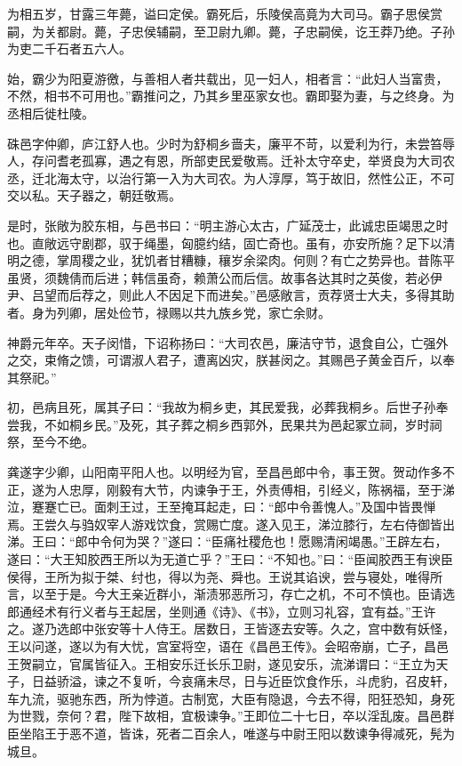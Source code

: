 \documentclass[12pt,UTF8]{ctexbook}
\begin{document}
为相五岁，甘露三年薨，谥曰定侯。霸死后，乐陵侯高竟为大司马。霸子思侯赏嗣，为关都尉。薨，子忠侯辅嗣，至卫尉九卿。薨，子忠嗣侯，讫王莽乃绝。子孙为吏二千石者五六人。



始，霸少为阳夏游徼，与善相人者共载出，见一妇人，相者言：“此妇人当富贵，不然，相书不可用也。”霸推问之，乃其乡里巫家女也。霸即娶为妻，与之终身。为丞相后徙杜陵。



硃邑字仲卿，庐江舒人也。少时为舒桐乡啬夫，廉平不苛，以爱利为行，未尝笞辱人，存问耆老孤寡，遇之有恩，所部吏民爱敬焉。迁补太守卒史，举贤良为大司农丞，迁北海太守，以治行第一入为大司农。为人淳厚，笃于故旧，然性公正，不可交以私。天子器之，朝廷敬焉。



是时，张敞为胶东相，与邑书曰：“明主游心太古，广延茂士，此诚忠臣竭思之时也。直敞远守剧郡，驭于绳墨，匈臆约结，固亡奇也。虽有，亦安所施？足下以清明之德，掌周稷之业，犹饥者甘糟糠，穰岁余梁肉。何则？有亡之势异也。昔陈平虽贤，须魏倩而后进；韩信虽奇，赖萧公而后信。故事各达其时之英俊，若必伊尹、吕望而后荐之，则此人不因足下而进矣。”邑感敞言，贡荐贤士大夫，多得其助者。身为列卿，居处俭节，禄赐以共九族乡党，家亡余财。



神爵元年卒。天子闵惜，下诏称扬曰：“大司农邑，廉洁守节，退食自公，亡强外之交，束脩之馈，可谓淑人君子，遭离凶灾，朕甚闵之。其赐邑子黄金百斤，以奉其祭祀。”



初，邑病且死，属其子曰：“我故为桐乡吏，其民爱我，必葬我桐乡。后世子孙奉尝我，不如桐乡民。”及死，其子葬之桐乡西郭外，民果共为邑起冢立祠，岁时祠祭，至今不绝。



龚遂字少卿，山阳南平阳人也。以明经为官，至昌邑郎中令，事王贺。贺动作多不正，遂为人忠厚，刚毅有大节，内谏争于王，外责傅相，引经义，陈祸福，至于涕泣，蹇蹇亡已。面刺王过，王至掩耳起走，曰：“郎中令善愧人。”及国中皆畏惮焉。王尝久与驺奴宰人游戏饮食，赏赐亡度。遂入见王，涕泣膝行，左右侍御皆出涕。王曰：“郎中令何为哭？”遂曰：“臣痛社稷危也！愿赐清闲竭愚。”王辟左右，遂曰：“大王知胶西王所以为无道亡乎？”王曰：“不知也。”曰：“臣闻胶西王有谀臣侯得，王所为拟于桀、纣也，得以为尧、舜也。王说其谄谀，尝与寝处，唯得所言，以至于是。今大王亲近群小，渐渍邪恶所习，存亡之机，不可不慎也。臣请选郎通经术有行义者与王起居，坐则通《诗》、《书》，立则习礼容，宜有益。”王许之。遂乃选郎中张安等十人侍王。居数日，王皆逐去安等。久之，宫中数有妖怪，王以问遂，遂以为有大忧，宫室将空，语在《昌邑王传》。会昭帝崩，亡子，昌邑王贺嗣立，官属皆征入。王相安乐迁长乐卫尉，遂见安乐，流涕谓曰：“王立为天子，日益骄溢，谏之不复听，今哀痛未尽，日与近臣饮食作乐，斗虎豹，召皮轩，车九流，驱驰东西，所为悖道。古制宽，大臣有隐退，今去不得，阳狂恐知，身死为世戮，奈何？君，陛下故相，宜极谏争。”王即位二十七日，卒以淫乱废。昌邑群臣坐陷王于恶不道，皆诛，死者二百余人，唯遂与中尉王阳以数谏争得减死，髡为城旦。
\end{document}
